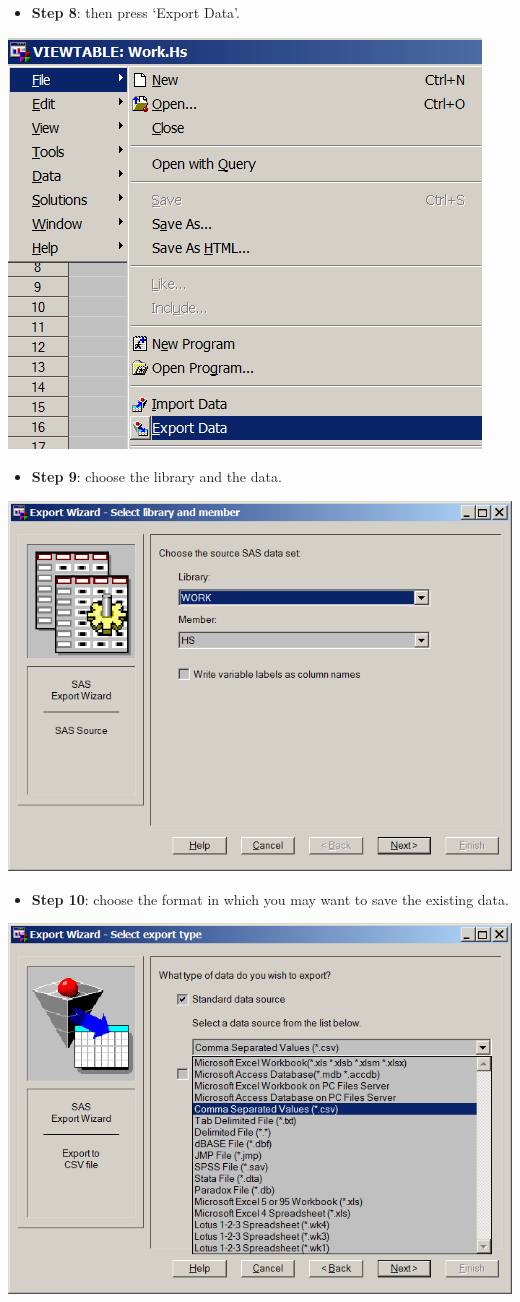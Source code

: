 \documentclass[
]{book}
\providecommand{\tightlist}{%
  \setlength{\itemsep}{0pt}\setlength{\parskip}{0pt}}
\begin{document}
\begin{itemize}
\tightlist
\item
  \textbf{Step 8}: then press `Export Data'.
\end{itemize}

\includegraphics[width=0.65\linewidth]{images/abacus21}

\begin{itemize}
\tightlist
\item
  \textbf{Step 9}: choose the library and the data.
\end{itemize}

\includegraphics[width=0.65\linewidth]{images/abacus22}

\begin{itemize}
\tightlist
\item
  \textbf{Step 10}: choose the format in which you may want to save the existing data.
\end{itemize}

\includegraphics[width=0.65\linewidth]{images/abacus23}
\end{document}
